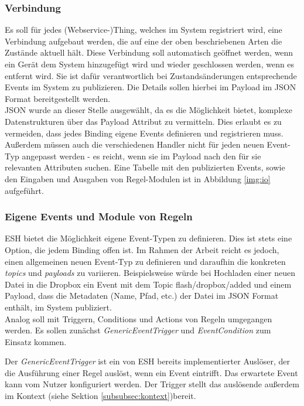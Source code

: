 \subsubsection{Verbindung}
Es soll für jedes (Webservice-)Thing, welches im System registriert wird, eine Verbindung aufgebaut werden, die auf eine der oben beschriebenen Arten die Zustände aktuell hält. Diese Verbindung soll automatisch geöffnet werden, wenn ein Gerät dem System hinzugefügt wird und wieder geschlossen werden, wenn es entfernt wird. Sie ist dafür verantwortlich bei Zustandsänderungen entsprechende Events im System zu publizieren. Die Details sollen hierbei im Payload im JSON Format bereitgestellt werden.\\

JSON wurde an dieser Stelle ausgewählt, da es die Möglichkeit bietet, komplexe Datenstrukturen über das Payload Attribut zu vermitteln. Dies erlaubt es zu vermeiden, dass jedes Binding eigene Events definieren und registrieren muss. Außerdem müssen auch die verschiedenen Handler nicht für jeden neuen Event-Typ angepasst werden - es reicht, wenn sie im Payload nach den für sie relevanten Attributen suchen. Eine Tabelle mit den publizierten Events, sowie den Eingaben und Ausgaben von Regel-Modulen ist in Abbildung \ref{img:io} aufgeführt.



\subsubsection{Eigene Events und Module von Regeln}
ESH bietet die Möglichkeit eigene Event-Typen zu definieren. Dies ist stets eine Option, die jedem Binding offen ist. Im Rahmen der Arbeit reicht es jedoch, einen allgemeinen neuen Event-Typ zu definieren und daraufhin die konkreten \textit{topics} und \textit{payloads} zu variieren. Beispielsweise würde bei Hochladen einer neuen Datei in die Dropbox ein Event mit dem Topic \glqq flash/dropbox/added\grqq{} und einem Payload, dass die Metadaten (Name, Pfad, etc.) der Datei im JSON Format enthält, im System publiziert.\\

Analog soll mit Triggern, Conditions und Actions von Regeln umgegangen werden. Es sollen zunächst \textit{GenericEventTrigger} und \textit{EventCondition} zum Einsatz kommen. 

Der \textit{GenericEventTrigger} ist ein von ESH bereits implementierter Auslöser, der die Ausführung einer Regel auslöst, wenn ein Event eintrifft. Das erwartete Event kann vom Nutzer konfiguriert werden. Der Trigger stellt das auslösende außerdem im Kontext (siehe Sektion \ref{subsubsec:kontext})bereit.

